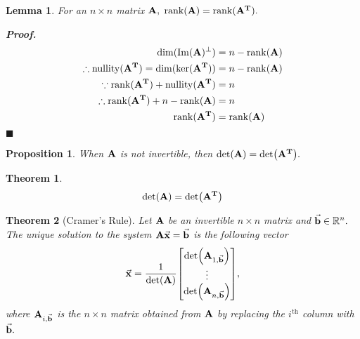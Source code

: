 \documentclass[12pt, a4paper]{article}
\newtheorem{thm}{Theorem}[subsection]
\newtheorem{lem}{Lemma}[section]
\newtheorem{prop}{Proposition}[section]
\newenvironment*{prf}{\par\indent\textbf{\textit{Proof. }}}{\hfill $\blacksquare$\par}
\def\R{{\mathbb{R}}}
\def\T{{\vb{T}}}
\def\rank{\mathrm{rank}}
\def\nullity{\mathrm{nullity}}
\def\vecx{\va{x}}
\def\vecb{\va{b}}
\def\matrixA{\vb{A}}
\begin{document}
\begin{lem}
	For an $n\times n$ matrix $\matrixA,$ $\rank(\matrixA)=\rank(\matrixA^\T).$
\end{lem}
\begin{prf}
	\[\begin{aligned}\dim(\Im(\matrixA)^\perp)&=n-\rank(\matrixA)\\\therefore\nullity(\matrixA^\T)=\dim(\ker(\matrixA^\T))&=n-\rank(\matrixA)\\\because\rank(\matrixA^\T)+\nullity(\matrixA^\T)&=n\\\therefore\rank(\matrixA^\T)+n-\rank(\matrixA)&=n\\\rank(\matrixA^\T)&=\rank(\matrixA)\end{aligned}\]
\end{prf}
\begin{prop}
	When $\matrixA$ is not invertible, then $\det(\matrixA)=\det(\matrixA^\T).$
\end{prop}
\begin{thm}
	\[\det(\matrixA)=\det(\matrixA^\T)\]	
\end{thm}
\begin{thm}[Cramer's Rule]
	Let $\matrixA$ be an invertible $n\times n$ matrix and $\vecb\in\R^n.$ The unique solution to the system $\matrixA\vecx=\vecb$ is the following vector \[\vecx=\dfrac{1}{\det(\matrixA)}\mqty[{\det(\matrixA_{1,\vecb})\\\vdots\\\det(\matrixA_{n,\vecb})}],\] where $\matrixA_{i,\vecb}$ is the $n\times n$ matrix obtained from $\matrixA$ by replacing the $i^\text{th}$ column with $\vecb.$
\end{thm}
\end{document}
